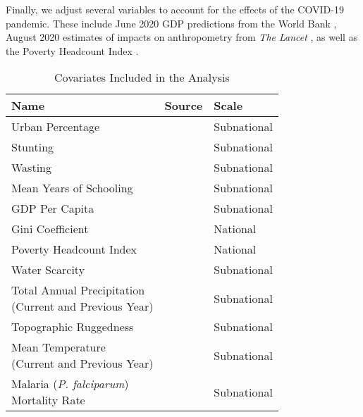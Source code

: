 \documentclass[titlepage]{article}
\begin{document}
Finally, we adjust several variables to account for the effects of the COVID-19 pandemic.  These include June 2020 GDP predictions from the World Bank \citep{prospects2020}, August 2020 estimates of impacts on anthropometry from \textit{The Lancet} \citep{headey2020impacts}, as well as the Poverty Headcount Index \citep{Cuaresma2018}.

\begin{table}[H]
  \centering
	\begin{tabular}{lll}
		\toprule
    Name & Source & Scale \\
		\midrule
    Urban Percentage & \cite{Jones2016} & Subnational \\ [1cm]
    Stunting & \cite{Local2020} & Subnational \\ [1cm]
    Wasting & \cite{Local2020} & Subnational \\ [1cm]
    Mean Years of Schooling & \makecell[tl]{\cite{Smits2019} \\ \cite{KC2017}} & Subnational\\ [1cm]
    GDP Per Capita & \makecell[tl]{\cite{Smits2019} \\ \cite{Dellink2017}} & Subnational \\ [1cm]
    Gini Coefficient & \cite{Rao2019a} & National\\ [1cm]
    Poverty Headcount Index & \cite{Cuaresma2018} & National \\ [1cm]
    Water Scarcity & \cite{greve2018global} & Subnational \\ [1cm]
    \makecell[tl]{Total Annual Precipitation \\ (Current and Previous Year)} & \makecell[tl]{\cite{abatzoglou2018terraclimate} \\ \cite{warszawski2014inter}} & Subnational \\ [1cm]
    Topographic Ruggedness &  \makecell[tl]{\cite{USGS1996} \\ \cite{Riley1999}} & Subnational \\ [1cm]
    \makecell[tl]{Mean Temperature \\ (Current and Previous Year)} &  \makecell[tl]{\cite{abatzoglou2018terraclimate} \\ \cite{warszawski2014inter}} & Subnational \\ [1cm]
    \makecell[tl]{Malaria (\textit{P. falciparum}) \\ Mortality Rate} & \cite{Weiss2019} & Subnational \\
		\bottomrule
	\end{tabular}
	\caption{Covariates Included in the Analysis}
	\label{tab:covars}
\end{table}
\end{document}
